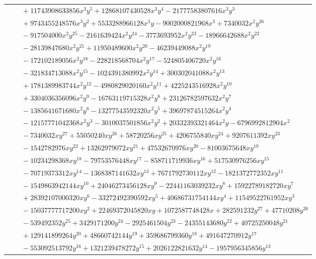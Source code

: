 \documentclass[11pt]{article}
\begin{document}
\begin{longtable}{@{}ll@{}}
 & $\quad +11743908633856x^{3}y^{5}+12868107430528x^{3}y^{4}-21777583807616x^{3}y^{3}$\\
 & $\quad +9743455248576x^{3}y^{2}+5533288966128x^{3}y-9002000821968x^{3}+7340032x^{2}y^{26}$\\
 & $\quad -917504000x^{2}y^{25}-2161639424x^{2}y^{24}-3773693952x^{2}y^{23}-18966642688x^{2}y^{22}$\\
 & $\quad -28139847680x^{2}y^{21}+11950489600x^{2}y^{20}-46239449088x^{2}y^{19}$\\
 & $\quad -172102189056x^{2}y^{18}-228218568704x^{2}y^{17}-524805406720x^{2}y^{16}$\\
 & $\quad -321834713088x^{2}y^{15}-1024391380992x^{2}y^{14}+300302041088x^{2}y^{13}$\\
 & $\quad +1781389983744x^{2}y^{12}-4980829020160x^{2}y^{11}+4225243516928x^{2}y^{10}$\\
 & $\quad +3304036356096x^{2}y^{9}-16763119715328x^{2}y^{8}+23126782597632x^{2}y^{7}$\\
 & $\quad -1385641671680x^{2}y^{6}-13277543592320x^{2}y^{5}+39697874515264x^{2}y^{4}$\\
 & $\quad -12157771042368x^{2}y^{3}-3010037501856x^{2}y^{2}+20332393321464x^{2}y-6796992812904x^{2}$\\
 & $\quad -7340032xy^{27}+55050240xy^{26}+58720256xy^{25}+4206755840xy^{24}+9207611392xy^{23}$\\
 & $\quad -1542782976xy^{22}+13262979072xy^{21}+47532670976xy^{20}-81003675648xy^{19}$\\
 & $\quad -10234298368xy^{18}-79753576448xy^{17}-858711719936xy^{16}+517530976256xy^{15}$\\
 & $\quad -70719373312xy^{14}-1368387141632xy^{13}+7671792730112xy^{12}-1821372772352xy^{11}$\\
 & $\quad -1549863942144xy^{10}+24046273456128xy^{9}-22441163039232xy^{8}+15922789182720xy^{7}$\\
 & $\quad +28392107000320xy^{6}-33272492390592xy^{5}+40686731754144xy^{4}+11549522761952xy^{3}$\\
 & $\quad -15037777717200xy^{2}+22469372045820xy+1072587748428x+282591232y^{27}+47710208y^{26}$\\
 & $\quad -539492352y^{25}+3429171200y^{24}-2925461504y^{23}-24355143680y^{22}+40725250048y^{21}$\\
 & $\quad +129141899264y^{20}+48660742144y^{19}+359686799360y^{18}+491647270912y^{17}$\\
 & $\quad -553092513792y^{16}+1321239478272y^{15}+2026122821632y^{14}-1957956345856y^{13}$\\

\end{longtable}
\end{document}
